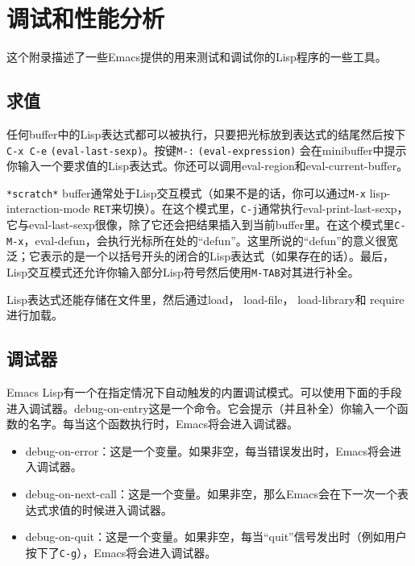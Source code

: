 \chapter{调试和性能分析}
\label{chapter:C-Debugging-and-Profiling}


这个附录描述了一些Emacs提供的用来测试和调试你的Lisp程序的一些工具。

\section{求值}
\label{section:C-Evaluation}

任何buffer中的Lisp表达式都可以被执行，只要把光标放到表达式的结尾然后按下\verb|C-x C-e| \texttt{(eval-last-sexp)}。按键\verb|M-:| \texttt{(eval-expression)} 会在minibuffer中提示你输入一个要求值的Lisp表达式。你还可以调用eval-region和eval-current-buffer。

\texttt{*scratch*} buffer通常处于Lisp交互模式（如果不是的话，你可以通过\verb|M-x| lisp-interaction-mode \verb|RET|来切换）。在这个模式里，\verb|C-j|通常执行eval-print-last-sexp，它与eval-last-sexp很像，除了它还会把结果插入到当前buffer里。在这个模式里\verb|C-M-x|，eval-defun，会执行光标所在处的“defun”。这里所说的“defun”的意义很宽泛；它表示的是一个以括号开头的闭合的Lisp表达式（如果存在的话）。最后，Lisp交互模式还允许你输入部分Lisp符号然后使用\verb|M-TAB|对其进行补全。

Lisp表达式还能存储在文件里，然后通过load， load-file， load-library和 require进行加载。

\section{调试器}
\label{section:C-The-Debugger}

Emacs Lisp有一个在指定情况下自动触发的内置调试模式。可以使用下面的手段进入调试器。debug-on-entry这是一个命令。它会提示（并且补全）你输入一个函数的名字。每当这个函数执行时，Emacs将会进入调试器。

\begin{itemize}
 \item debug-on-error：这是一个变量。如果非空，每当错误发出时，Emacs将会进入调试器。
 \item debug-on-next-call：这是一个变量。如果非空，那么Emacs会在下一次一个表达式求值的时候进入调试器。
 \item debug-on-quit：这是一个变量。如果非空，每当“quit”信号发出时（例如用户按下了\verb|C-g|），Emacs将会进入调试器。
\end{itemize}


